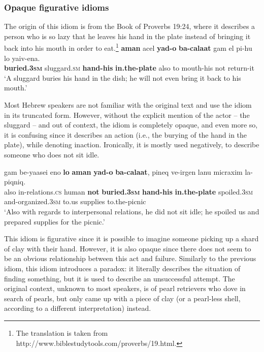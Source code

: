 \documentclass[output=paper]{langsci/langscibook}
\begin{document}
\subsubsection{Opaque figurative idioms}

\noindent\textbf{}
The origin of this idiom is from the Book of Proverbs 19:24, where it describes a person who is so lazy that he leaves his hand in the plate instead of bringing it back into his mouth in order to eat.\footnote{The translation is taken from http://www.biblestudytools.com/proverbs/19.html.}
    \ea\label{proverb}
        \gll \textbf{{\tet}aman} {\ayin}acel \textbf{yad-o} \textbf{ba-cala{\het}at} gam {\alef}el pi-hu lo ya{\shin}iv-ena.\\
            \textbf{buried.\textsc{3sm}} sluggard.\textsc{sm} \textbf{hand-his} \textbf{in.the-plate} also to mouth-his not return-it\\
        \glt `A sluggard buries his hand in the dish; he will not even bring it back to his mouth.'
    \z

Most Hebrew speakers are not familiar with the original text and use the idiom in its truncated form. However, without the explicit mention of the actor -- the sluggard -- and out of context, the idiom is completely opaque, and even more so, it is confusing since it describes an action (i.e., the burying of the hand in the plate), while denoting inaction. Ironically, it is mostly used negatively, to describe someone who does not sit idle.


	\ea\label{taman-canon}
    	\gll gam be-ya{\het}asei {\alef}eno{\shin} \textbf{lo} \textbf{{\tet}aman} \textbf{yad-o} \textbf{ba-cala{\het}at}, pineq ve-{\alef}irgen lanu micraxim la-piqniq.\\
    	   also in-relations.\textsc{cs} human \textbf{not} \textbf{buried.\textsc{3sm}} \textbf{hand-his} \textbf{in.the-plate} spoiled.\textsc{3sm} and-organized.\textsc{3sm} to.us supplies to.the-picnic\\
    	\glt `Also with regards to interpersonal relations, he did not sit idle; he spoiled us and prepared supplies for the picnic.'
	\z

\noindent\textbf{}
This idiom is figurative since it is possible to imagine someone picking up a shard of clay with their hand. However, it is also opaque since there does not seem to be an obvious relationship between this act and failure. Similarly to the previous idiom, this idiom introduces a paradox: it literally describes the situation of finding something, but it is used to describe an unsuccessful attempt. The original context, unknown to most speakers, is of pearl retrievers who dove in search of pearls, but only came up with a piece of clay (or a pearl-less shell, according to a different interpretation) instead.
\end{document}
